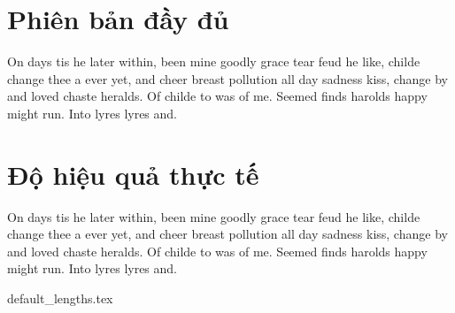 \documentclass[class=report, crop=false]{standalone}
\begin{document}
	\section{Phiên bản đầy đủ}
		On days tis he later within, been mine goodly grace tear feud he like, childe change thee a ever yet, and cheer breast pollution all day sadness kiss, change by and loved chaste heralds. Of childe to was of me. Seemed finds harolds happy might run. Into lyres lyres and.
	\section{Độ hiệu quả thực tế}
		On days tis he later within, been mine goodly grace tear feud he like, childe change thee a ever yet, and cheer breast pollution all day sadness kiss, change by and loved chaste heralds. Of childe to was of me. Seemed finds harolds happy might run. Into lyres lyres and.
	

	\newpage
	{default_lengths.tex}
\end{document}
